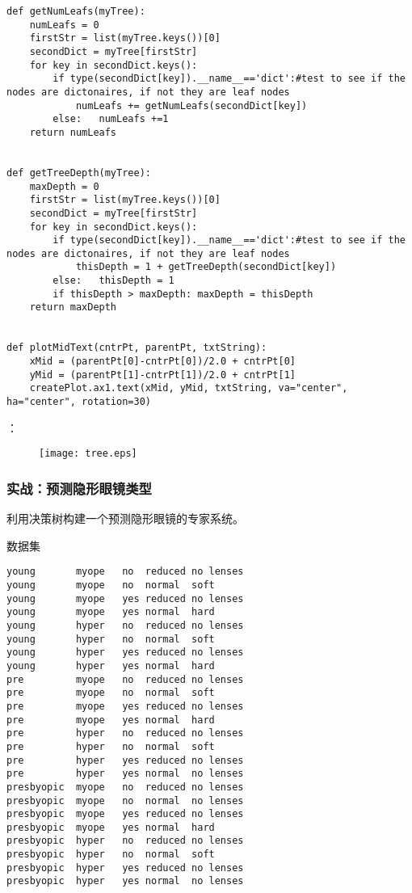 \begin{lstlisting}
def getNumLeafs(myTree):
    numLeafs = 0
    firstStr = list(myTree.keys())[0]
    secondDict = myTree[firstStr]
    for key in secondDict.keys():
        if type(secondDict[key]).__name__=='dict':#test to see if the nodes are dictonaires, if not they are leaf nodes
            numLeafs += getNumLeafs(secondDict[key])
        else:   numLeafs +=1
    return numLeafs


def getTreeDepth(myTree):
    maxDepth = 0
    firstStr = list(myTree.keys())[0]
    secondDict = myTree[firstStr]
    for key in secondDict.keys():
        if type(secondDict[key]).__name__=='dict':#test to see if the nodes are dictonaires, if not they are leaf nodes
            thisDepth = 1 + getTreeDepth(secondDict[key])
        else:   thisDepth = 1
        if thisDepth > maxDepth: maxDepth = thisDepth
    return maxDepth


def plotMidText(cntrPt, parentPt, txtString):
    xMid = (parentPt[0]-cntrPt[0])/2.0 + cntrPt[0]
    yMid = (parentPt[1]-cntrPt[1])/2.0 + cntrPt[1]
    createPlot.ax1.text(xMid, yMid, txtString, va="center", ha="center", rotation=30)
\end{lstlisting}


：
\begin{figure}[h]
  \centering
  \texttt{[image: tree.eps]}
\end{figure}



\subsubsection{实战：预测隐形眼镜类型}
利用决策树构建一个预测隐形眼镜的专家系统。

\noindent 数据集
\begin{lstlisting}
young	    myope	no	reduced	no lenses
young	    myope	no	normal	soft
young	    myope	yes	reduced	no lenses
young	    myope	yes	normal	hard
young	    hyper	no	reduced	no lenses
young	    hyper	no	normal	soft
young	    hyper	yes	reduced	no lenses
young	    hyper	yes	normal	hard
pre	        myope	no	reduced	no lenses
pre	        myope	no	normal	soft
pre	        myope	yes	reduced	no lenses
pre	        myope	yes	normal	hard
pre 	    hyper	no	reduced	no lenses
pre	        hyper	no	normal	soft
pre 	    hyper	yes	reduced	no lenses
pre     	hyper	yes	normal	no lenses
presbyopic	myope	no	reduced	no lenses
presbyopic	myope	no	normal	no lenses
presbyopic	myope	yes	reduced	no lenses
presbyopic	myope	yes	normal	hard
presbyopic	hyper	no	reduced	no lenses
presbyopic	hyper	no	normal	soft
presbyopic	hyper	yes	reduced	no lenses
presbyopic	hyper	yes	normal	no lenses
\end{lstlisting}


